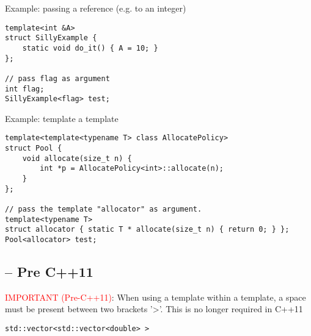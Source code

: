 Example: passing a reference (e.g. to an integer)
\begin{lstlisting}
template<int &A>
struct SillyExample {
    static void do_it() { A = 10; }
};

// pass flag as argument
int flag;
SillyExample<flag> test;
\end{lstlisting}


Example: template a template
\begin{lstlisting}
template<template<typename T> class AllocatePolicy>
struct Pool {
    void allocate(size_t n) {
        int *p = AllocatePolicy<int>::allocate(n);
    }
};

// pass the template "allocator" as argument. 
template<typename T>
struct allocator { static T * allocate(size_t n) { return 0; } };
Pool<allocator> test;
\end{lstlisting}


\subsection{-- Pre C++11}

\textcolor{red}{IMPORTANT (Pre-C++11)}: When using a template within a template,
a space must be present between two brackets '>'. This is no longer required in
C++11
\begin{lstlisting}
std::vector<std::vector<double> >
\end{lstlisting}

